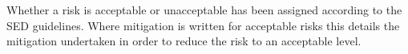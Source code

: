 \documentclass[a4paper,12pt,oneside]{article} %
\providecommand{\DIFaddbegin}{} %
\providecommand{\DIFaddend}{} %
\providecommand{\DIFdelbegin}{} %
\providecommand{\DIFdelend}{} %
\newcommand{\DIFscaledelfig}{0.5}
\newlength{\DIFdelgraphicswidth} %
\newlength{\DIFdelgraphicsheight} %
\newcommand{\DIFaddincludegraphics}[2][]{{\color{blue}\fbox{\DIFOincludegraphics[#1]{#2}}}} %
\newcommand{\DIFdelincludegraphics}[2][]{%
\sbox{\DIFdelgraphicsbox}{\DIFOincludegraphics[#1]{#2}}%
\settoboxwidth{\DIFdelgraphicswidth}{\DIFdelgraphicsbox} %
\settoboxtotalheight{\DIFdelgraphicsheight}{\DIFdelgraphicsbox} %
\scalebox{\DIFscaledelfig}{%
\parbox[b]{\DIFdelgraphicswidth}{\usebox{\DIFdelgraphicsbox}\\[-\baselineskip] \rule{\DIFdelgraphicswidth}{0em}}\llap{\resizebox{\DIFdelgraphicswidth}{\DIFdelgraphicsheight}{%
\setlength{\unitlength}{\DIFdelgraphicswidth}%
\begin{picture}(1,1)%
\thicklines\linethickness{2pt} %
{\color[rgb]{1,0,0}\put(0,0){\framebox(1,1){}}}%
{\color[rgb]{1,0,0}\put(0,0){\line( 1,1){1}}}%
{\color[rgb]{1,0,0}\put(0,1){\line(1,-1){1}}}%
\end{picture}%
}\hspace*{3pt}}} %
} %
\DeclareRobustCommand{\DIFaddbegin}{\DIFOaddbegin \let\includegraphics\DIFaddincludegraphics} %
\DeclareRobustCommand{\DIFaddend}{\DIFOaddend \let\includegraphics\DIFOincludegraphics} %
\DeclareRobustCommand{\DIFdelbegin}{\DIFOdelbegin \let\includegraphics\DIFdelincludegraphics} %
\DeclareRobustCommand{\DIFdelend}{\DIFOaddend \let\includegraphics\DIFOincludegraphics} %
\begin{document}
Whether a risk is acceptable or unacceptable has been assigned according to the SED guidelines. Where mitigation is written for acceptable risks this details the mitigation undertaken in order to reduce the risk to an acceptable level.

\begin{landscape}



\DIFdelbegin %
\DIFdelend \DIFaddbegin \begin{longtable}{|m{}| m{} |m{} |m{}|m{}| m{}|}
\DIFaddend 


\end{longtable}
\end{landscape}
\end{document}
